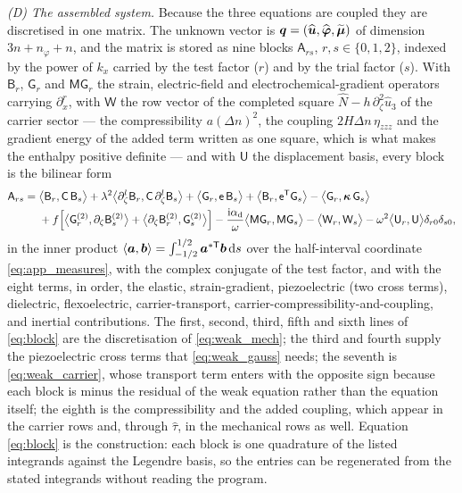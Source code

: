 \emph{(D) The assembled system.}  Because the three equations are coupled they are
discretised in one matrix.  The unknown vector is
$\boldsymbol{q}=(\widehat{\boldsymbol{u}},\widehat{\boldsymbol\varphi},
\widetilde{\boldsymbol\mu})$ of dimension $3n+n_\varphi+n$, and the matrix is
stored as nine blocks $\mathsf A_{rs}$, $r,s\in\{0,1,2\}$, indexed by the power of
$k_x$ carried by the test factor ($r$) and by the trial factor ($s$).  With
$\mathsf B_r$, $\mathsf G_r$ and $\mathsf M\mathsf G_r$ the strain, electric-field
and electrochemical-gradient operators carrying $\partial_x^{r}$, with
$\mathsf W$ the row vector of the completed square
$\widehat N-h\,\partial_\zeta^{2}\widehat u_3$ of the carrier sector --- the
compressibility $a(\Delta n)^{2}$, the coupling $2H\Delta n\,\eta_{zzz}$ and the
gradient energy of the added term written as one square, which is what makes the
enthalpy positive definite --- and with $\mathsf U$ the displacement basis, every block is the bilinear form
\begin{equation}
\label{eq:block}
\begin{aligned}
\mathsf A_{rs}={}&\bigl\langle\mathsf B_r,\mathsf C\,\mathsf B_s\bigr\rangle
+\lambda^{2}\bigl\langle\partial_\zeta^{l}\mathsf B_r,
\mathsf C\,\partial_\zeta^{l}\mathsf B_s\bigr\rangle
+\bigl\langle\mathsf G_r,\mathsf e\,\mathsf B_s\bigr\rangle
+\bigl\langle\mathsf B_r,\mathsf e^{\mathsf T}\mathsf G_s\bigr\rangle
-\bigl\langle\mathsf G_r,\boldsymbol\kappa\,\mathsf G_s\bigr\rangle\\
&+f\Bigl[\bigl\langle\mathsf G_r^{(2)},\partial_\zeta\mathsf B_s^{(2)}\bigr\rangle
+\bigl\langle\partial_\zeta\mathsf B_r^{(2)},\mathsf G_s^{(2)}\bigr\rangle\Bigr]
-\frac{\mathrm{i}\alpha_{\mathrm d}}{\omega}\bigl\langle\mathsf M\mathsf G_r,
\mathsf M\mathsf G_s\bigr\rangle
-\bigl\langle\mathsf W_r,\mathsf W_s\bigr\rangle
-\omega^{2}\bigl\langle\mathsf U_r,\mathsf U\bigr\rangle\delta_{r0}\delta_{s0},
\end{aligned}
\end{equation}
in the inner product $\langle\boldsymbol{a},\boldsymbol{b}\rangle=\int_{-1/2}^{1/2}
\boldsymbol{a}^{*\mathsf T}\boldsymbol{b}\,\mathrm{d} s$ over the half-interval coordinate
\eqref{eq:app_measures}, with the complex conjugate of the test factor, and with the eight terms, in order, the elastic, strain-gradient,
piezoelectric (two cross terms), dielectric, flexoelectric, carrier-transport,
carrier-compressibility-and-coupling, and inertial contributions.  The first,
second, third, fifth and sixth lines of \eqref{eq:block} are the discretisation of
\eqref{eq:weak_mech}; the third and fourth supply the piezoelectric cross terms
that \eqref{eq:weak_gauss} needs; the seventh is \eqref{eq:weak_carrier}, whose
transport term enters with the opposite sign because each block is minus the
residual of the weak equation rather than the equation itself;
the eighth is the compressibility and the added coupling, which appear in the carrier
rows and, through $\widehat\tau$, in the mechanical rows as well.  Equation
\eqref{eq:block} is the construction: each block is one quadrature of the listed
integrands against the Legendre basis, so the entries can be regenerated from the
stated integrands without reading the program.

